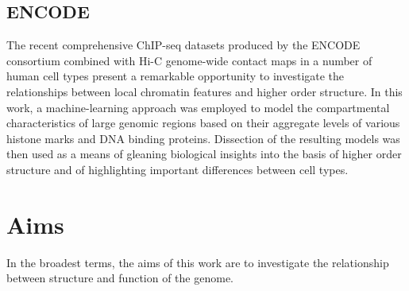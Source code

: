 \documentclass[a4paper,10pt,oneside]{book}
\begin{document}
\subsection{ENCODE}

The recent comprehensive ChIP-seq datasets
produced by the ENCODE consortium\cite{Dunham2012} combined with Hi-C
genome-wide contact maps in a number of human cell
types\cite{Dixon2012, Lieberman2009, Kalhor2012} present a remarkable
opportunity to investigate the relationships between local
chromatin features and higher order structure. In this work, a
machine-learning approach was employed to model the
compartmental characteristics of large genomic regions based on their
aggregate levels of various histone marks and DNA binding
proteins. Dissection of the resulting models was then used as a
means of gleaning biological insights into the basis of higher order
structure and of highlighting important differences between cell types.


\section{Aims}

In the broadest terms, the aims of this work are to investigate the relationship between structure and function of the genome.

\begin{small}

\end{small}
\end{document}
